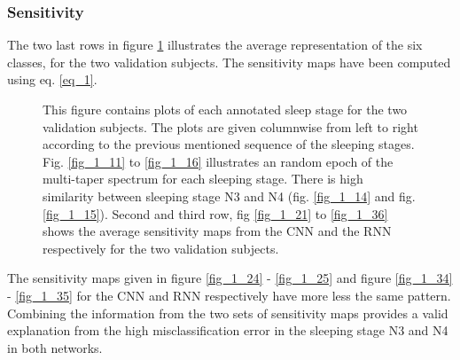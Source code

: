\subsubsection{Sensitivity}

The two last rows in figure \ref{fig_1} illustrates the average representation of the six classes, for the two validation subjects. The sensitivity maps have been computed using eq. \ref{eq_1}.

\begin{figure*}[th!]
\centering

\caption{This figure contains plots of each annotated sleep stage for the two validation subjects. The plots are given columnwise from left to right according to the previous mentioned sequence of the sleeping stages. Fig. \ref{fig_1_11} to \ref{fig_1_16} illustrates an random epoch of the multi-taper spectrum for each sleeping stage. There is high similarity between sleeping stage N3 and N4 (fig. \ref{fig_1_14} and fig. \ref{fig_1_15}). Second and third row, fig \ref{fig_1_21} to \ref{fig_1_36} shows the average sensitivity maps from the CNN and the RNN respectively for the two validation subjects.}
\label{fig_1}
\end{figure*}

The sensitivity maps given in figure \ref{fig_1_24} - \ref{fig_1_25} and figure \ref{fig_1_34} - \ref{fig_1_35} for the CNN and RNN respectively have more less the same pattern. Combining the information from the two sets of sensitivity maps provides a valid explanation from the high misclassification error in the sleeping stage N3 and N4 in both networks.
